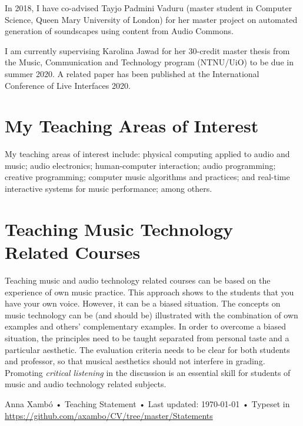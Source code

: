 \documentclass[10pt, a4paper]{article}
\begin{document}
In 2018, I have co-advised Tayjo Padmini Vaduru (master student in Computer Science, Queen Mary University of London) for her master project on automated generation of soundscapes using content from Audio Commons.

I am currently supervising Karolina Jawad for her 30-credit master thesis from the Music, Communication and Technology program (NTNU/UiO) to be due in summer 2020. A related paper has been published at the International Conference of Live Interfaces 2020.

\section*{My Teaching Areas of Interest}

My teaching areas of interest include: physical computing applied to audio and music; audio electronics; human-computer interaction; audio programming; creative programming; computer music algorithms and practices; and real-time interactive systems for music performance; among others. 

\section*{Teaching Music Technology Related Courses}

Teaching music and audio technology related courses can be based on the experience of own music practice. This approach shows to the students that you have your own voice. However, it can be a biased situation. The concepts on music technology can be (and should be) illustrated with the combination of own examples and others' complementary examples. In order to overcome a biased situation, the principles need to be taught separated from  personal taste and a particular aesthetic. The evaluation criteria needs to be clear for both students and professor, so that musical aesthetics should not interfere in grading. Promoting \emph{critical listening} in the discussion is an essential skill for students of music and audio technology related subjects. 

\vfill{}

\begin{center}
{\scriptsize  Anna Xambó •\- Teaching Statement •\- Last updated: \today\- •\- %
Typeset in \href{http://nitens.org/taraborelli/cvtex}{
\XeTeX }\\
\href{https://github.com/axambo/CV/tree/master/Statements}{https://github.com/axambo/CV/tree/master/Statements}}
\end{center}
\end{document}
